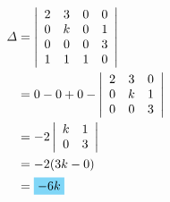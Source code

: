 \begin{align*}
	\Delta &=\left|
	\begin{array}{cccc}
		2&3&0&0 \\
		0&k&0&1 \\
		0&0&0&3 \\
		1&1&1&0 \\
	\end{array}
	\right| \\
	&= 0-0+0-\left|
	\begin{array}{ccc}
		2&3&0 \\
		0&k&1 \\
		0&0&3 \\
	\end{array}
	\right| \\
	&= -2\left|
	\begin{array}{cc}
		k&1 \\
		0&3 \\
	\end{array}
	\right| \\
	&=-2(3k-0) \\
	&=\hlbox{$-6k$}
\end{align*}